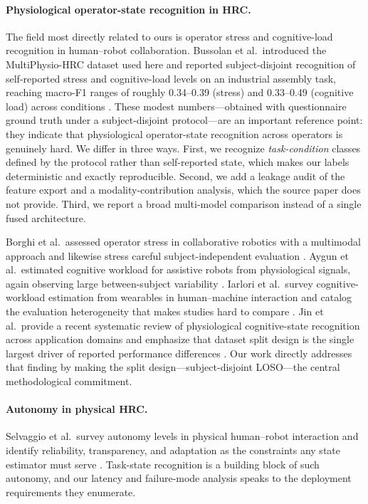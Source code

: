 \documentclass{llncs}
\begin{document}
\paragraph{Physiological operator-state recognition in \ac{HRC}.}
The field most directly related to ours is operator stress and cognitive-load
recognition in human--robot collaboration. Bussolan et al.\ introduced the
MultiPhysio-\ac{HRC} dataset used here and reported subject-disjoint recognition of
self-reported stress and cognitive-load levels on an industrial assembly task,
reaching macro-F1 ranges of roughly 0.34--0.39 (stress) and 0.33--0.49
(cognitive load) across conditions
\cite{bussolan2025multiphysiohrc,bussolan2024stressdetector}. These modest
numbers---obtained with questionnaire
ground truth under a subject-disjoint protocol---are an important reference point:
they indicate that physiological operator-state recognition across operators is
genuinely hard. We differ in three ways. First, we recognize \emph{task-condition}
classes defined by the protocol rather than self-reported state, which makes our
labels deterministic and exactly reproducible. Second, we add a leakage audit of the
feature export and a modality-contribution analysis, which the source paper does not
provide. Third, we report a broad multi-model comparison instead of a single fused
architecture.

Borghi et al.\ assessed operator stress in collaborative robotics with a multimodal
approach and likewise stress careful subject-independent evaluation
\cite{borghi2025operatorstress}. Aygun et al.\ estimated cognitive workload for
assistive robots from physiological signals, again observing large between-subject
variability \cite{aygun2022assistive}. Iarlori et al.\ survey cognitive-workload
estimation from wearables in human--machine interaction and catalog the evaluation
heterogeneity that makes studies hard to compare \cite{iarlori2024cognitiveworkload}.
Jin et al.\ provide a recent systematic review of physiological cognitive-state
recognition across application domains and emphasize that dataset split design is
the single largest driver of reported performance differences \cite{jin2025cognitivestate}.
Our work directly addresses that finding by making the split design---subject-disjoint
\ac{LOSO}---the central methodological commitment.

\paragraph{Autonomy in physical \ac{HRC}.}
Selvaggio et al.\ survey autonomy levels in physical human--robot interaction and
identify reliability, transparency, and adaptation as the constraints any state
estimator must serve \cite{selvaggio2021autonomy}. Task-state recognition is a
building block of such autonomy, and our latency and failure-mode analysis speaks to
the deployment requirements they enumerate.
\end{document}
